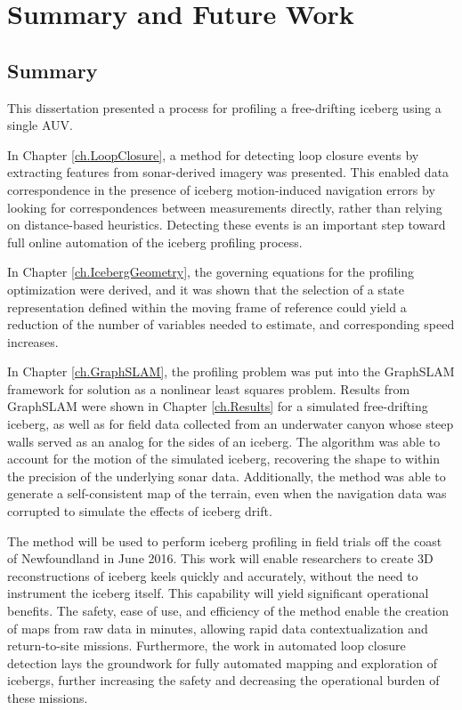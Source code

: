 
\chapter{Summary and Future Work}
\label{ch.FutureWork}

\section{Summary}

This dissertation presented a process for profiling a free-drifting iceberg using a single AUV. 

In Chapter \ref{ch.LoopClosure}, a method for detecting loop closure events by extracting features from sonar-derived imagery was presented. This enabled data correspondence in the presence of iceberg motion-induced navigation errors by looking for correspondences between measurements directly, rather than relying on distance-based heuristics. Detecting these events is an important step toward full online automation of the iceberg profiling process.

In Chapter \ref{ch.IcebergGeometry}, the governing equations for the profiling optimization were derived, and it was shown that the selection of a state representation defined within the moving frame of reference could yield a reduction of the number of variables needed to estimate, and corresponding speed increases. 

In Chapter \ref{ch.GraphSLAM}, the profiling problem was put into the GraphSLAM framework for solution as a nonlinear least squares problem. Results from GraphSLAM were shown in Chapter \ref{ch.Results} for a simulated free-drifting iceberg, as well as for field data collected from an underwater canyon whose steep walls served as an analog for the sides of an iceberg. The algorithm was able to account for the motion of the simulated iceberg, recovering the shape to within the precision of the underlying sonar data. Additionally, the method was able to generate a self-consistent map of the terrain, even when the navigation data was corrupted to simulate the effects of iceberg drift. 

The method will be used to perform iceberg profiling in field trials off the coast of Newfoundland in June 2016. This work will enable researchers to create 3D reconstructions of iceberg keels quickly and accurately, without the need to instrument the iceberg itself. This capability will yield significant operational benefits. The safety, ease of use, and efficiency of the method enable the creation of maps from raw data in minutes, allowing rapid data contextualization and return-to-site missions. Furthermore, the work in automated loop closure detection lays the groundwork for fully automated mapping and exploration of icebergs, further increasing the safety and decreasing the operational burden of these missions. 



